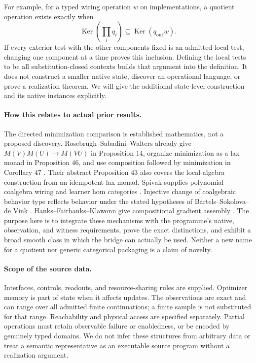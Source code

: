 \documentclass[11pt]{article}
\theoremstyle{definition}
\theoremstyle{remark}\newtheorem{remark}[theorem]{Remark}
\newcommand{\Ker}{\operatorname{Ker}}
\begin{document}
For example, for a typed wiring operation $w$ on implementations, a quotient
operation exists exactly when
\[
 \Ker\!\left(\prod_i q_i\right)
       \subseteq\Ker(q_{\mathrm{out}}w).
\]
If every exterior test with the other components fixed is an admitted local
test, changing one component at a time proves this inclusion. Defining the
local tests to be all substitution-closed contexts builds that argument into
the definition. It does not construct a smaller native state, discover an
operational language, or prove a realization theorem. We will give the
additional state-level construction and its native instances explicitly.

\paragraph{How this relates to actual prior results.}
The directed minimization comparison is established mathematics, not a
proposed discovery. Rosebrugh--Sabadini--Walters already give
$M(V)M(U)\to M(VU)$ in Proposition 14, organize minimization as a lax monad
in Proposition 46, and use composition followed by minimization in
Corollary 47 \cite{RSW}. Their abstract Proposition 43 also covers the
local-algebra construction from an idempotent lax monad. Spivak supplies
polynomial-coalgebra wiring and learner hom categories \cite{spivak}.
Injective change of coalgebraic behavior type reflects behavior under the
stated hypotheses of Bartels--Sokolova--de Vink \cite{bartels}.
Hanks--Fairbanks--Klawonn give compositional gradient assembly \cite{HFK}.
The purpose here is to integrate these mechanisms with the programme's
native, observation, and witness requirements, prove the exact distinctions,
and exhibit a broad smooth class in which the bridge can actually be used.
Neither a new name for a quotient nor generic categorical packaging is a
claim of novelty.

\paragraph{Scope of the source data.}
Interfaces, controls, readouts, and resource-sharing rules are supplied.
Optimizer memory is part of state when it affects updates. The observations
are exact and can range over all admitted finite continuations; a finite
sample is not substituted for that range. Reachability and physical access
are specified separately. Partial operations must retain observable failure
or enabledness, or be encoded by genuinely typed domains. We do not infer
these structures from arbitrary data or treat a semantic representative as
an executable source program without a realization argument.
\end{document}
